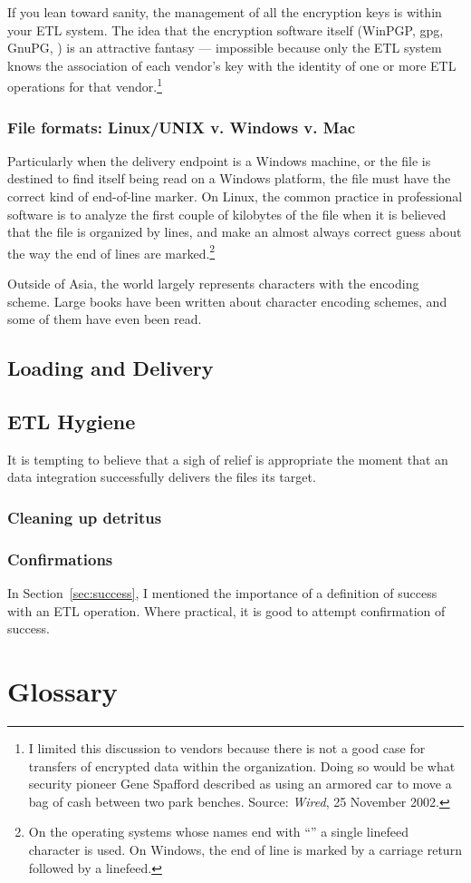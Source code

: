 \documentclass[11pt,letterpaper,twosided]{memoir}
\begin{document}
If you lean toward sanity, the management of all the encryption
keys is within your ETL system. The idea that the encryption software
itself (WinPGP, gpg, GnuPG, \etc) is an attractive fantasy ---
impossible because only the ETL system knows the association of
each vendor's key with the identity of one or more ETL operations
for that vendor.\footnote{I limited this discussion to vendors
because there is not a good case for transfers of encrypted data
within the organization. Doing so would be what security pioneer
Gene Spafford described as using an armored car to move a bag of
cash between two park benches. Source: \emph{Wired}, 25 November
2002.}

\subsection{File formats: Linux/UNIX v. Windows v. Mac}

Particularly when the delivery endpoint is a Windows machine, or
the file is destined to find itself being read on a Windows platform,
the file must have the correct kind of end-of-line marker. On Linux,
the common practice in professional software is to analyze the first
couple of kilobytes of the file when it is believed that the file
is organized by lines, and make an almost always correct guess about
the way the end of lines are marked.\footnote{On the operating
systems whose names end with ``'' a single linefeed character
is used. On Windows, the end of line is marked by a carriage return
followed by a linefeed.}

Outside of Asia, the world largely represents characters with 
the  encoding scheme. Large books have been written
about character encoding schemes, and some of them have even been
read. 

\section{Loading and Delivery}

\section{ETL Hygiene}

It is tempting to believe that a sigh of relief is appropriate the
moment that an data integration successfully delivers the files its
target. 

\subsection{Cleaning up detritus}


\subsection{Confirmations}

In Section~\ref{sec:success}, I mentioned the importance of a 
definition of success with an ETL operation. Where practical, it is 
good to attempt confirmation of success. 


\appendix
\chapter{Glossary}
\end{document}
